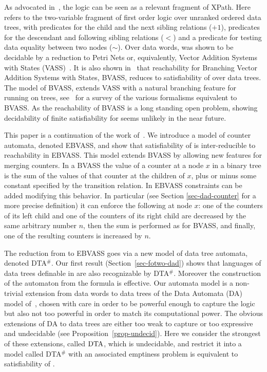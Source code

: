 \documentclass{CSML}
\newcommand\vass{\textup{VASS}\xspace}
\newcommand\bvass{\textup{BVASS}\xspace}
\newcommand\ebvass{\textup{EBVASS}\xspace}
\newcommand\xpath{\textup{XPath}\xspace}
\newcommand\dad{\textup{DTA}$^\#$\xspace}
\newcommand\wdad{\textup{DTA}\xspace}
\begin{document}
As advocated in~\cite{BojanczykMSS09jacm}, the logic 
\fotwo can be seen as a relevant fragment of \xpath. 
Here \fotwo refers to the two-variable fragment of first
order logic over unranked ordered data trees, with predicates for the child and the next
sibling relations ($+1$), predicates for the descendant and following sibling
relations ($<$) and a predicate for testing data equality between two nodes ($\sim$).
Over data words, \fotwo was shown to be decidable by a reduction to Petri Nets or,
equivalently, Vector Addition Systems with States (\vass)~\cite{BDMSS11}.  
It is also shown in~\cite{BojanczykMSS09jacm} that reachability for
Branching Vector Addition Systems with States, \bvass, 
reduces to satisfiability of \fotwo over data trees.  
The model of \bvass,  extends \vass with a natural branching feature for running
on trees, see~\cite{acl10} for a survey of the various formalisms equivalent to
\bvass.  As the reachability of \bvass is a long standing open problem, showing
decidability of finite satisfiability for \fotwo seems unlikely in the near future.

This paper is a continuation of the work of~\cite{BDMSS11,BojanczykMSS09jacm}.
We introduce a model of counter automata, denoted \ebvass, and show that
satisfiability of \fotwo is inter-reducible to reachability in \ebvass. 
This model extends \bvass by allowing new features for merging counters.  
In a \bvass the value of a counter at a node $x$ in a binary tree
is the sum of the values of that counter at the children of $x$, 
plus or minus some constant specified by the transition relation. 
In \ebvass constraints can be added modifying this behavior. In particular
(see Section \ref{sec-dad-counter} for a more precise definition) it can enforce the
following at node $x$: 
one of the counters of its left child and one
of the counters of its right child are decreased by the same arbitrary number $n$, 
then the sum is performed as for \bvass, and finally, 
one of the resulting counters is increased by $n$.

The reduction from \fotwo to \ebvass goes via a new
model of data tree automata, denoted \dad. 
Our first result (Section~\ref{sec-fotwo-dad}) shows that languages of data trees 
definable in \fotwo are also recognizable by \dad.  
Moreover the construction of the automaton from the formula is effective. 
Our automata model is a non-trivial extension
from data words to data trees of the Data Automata (DA) model
of~\cite{BDMSS11}, chosen with care in order to be powerful enough to capture the logic 
but also not too powerful in order to match its computational power. 
The obvious extensions of DA to data trees are either too weak to capture \fotwo 
or too expressive and undecidable (see Proposition~\ref{prop-undecid}).
Here we consider the strongest of these extensions, called $\wdad$, 
which is undecidable,
and restrict it into a model called \dad
with an associated emptiness problem is equivalent to satisfiability of \fotwo.
\end{document}
